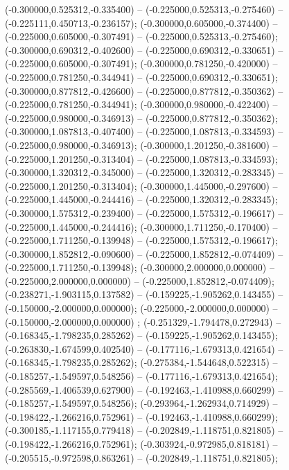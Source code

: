  (-0.300000,0.525312,-0.335400) -- (-0.225000,0.525313,-0.275460) -- (-0.225111,0.450713,-0.236157);
 (-0.300000,0.605000,-0.374400) -- (-0.225000,0.605000,-0.307491) -- (-0.225000,0.525313,-0.275460);
 (-0.300000,0.690312,-0.402600) -- (-0.225000,0.690312,-0.330651) -- (-0.225000,0.605000,-0.307491);
 (-0.300000,0.781250,-0.420000) -- (-0.225000,0.781250,-0.344941) -- (-0.225000,0.690312,-0.330651);
 (-0.300000,0.877812,-0.426600) -- (-0.225000,0.877812,-0.350362) -- (-0.225000,0.781250,-0.344941);
 (-0.300000,0.980000,-0.422400) -- (-0.225000,0.980000,-0.346913) -- (-0.225000,0.877812,-0.350362);
 (-0.300000,1.087813,-0.407400) -- (-0.225000,1.087813,-0.334593) -- (-0.225000,0.980000,-0.346913);
 (-0.300000,1.201250,-0.381600) -- (-0.225000,1.201250,-0.313404) -- (-0.225000,1.087813,-0.334593);
 (-0.300000,1.320312,-0.345000) -- (-0.225000,1.320312,-0.283345) -- (-0.225000,1.201250,-0.313404);
 (-0.300000,1.445000,-0.297600) -- (-0.225000,1.445000,-0.244416) -- (-0.225000,1.320312,-0.283345);
 (-0.300000,1.575312,-0.239400) -- (-0.225000,1.575312,-0.196617) -- (-0.225000,1.445000,-0.244416);
 (-0.300000,1.711250,-0.170400) -- (-0.225000,1.711250,-0.139948) -- (-0.225000,1.575312,-0.196617);
 (-0.300000,1.852812,-0.090600) -- (-0.225000,1.852812,-0.074409) -- (-0.225000,1.711250,-0.139948);
 (-0.300000,2.000000,0.000000) -- (-0.225000,2.000000,0.000000) -- (-0.225000,1.852812,-0.074409);
 (-0.238271,-1.903115,0.137582) -- (-0.159225,-1.905262,0.143455) -- (-0.150000,-2.000000,0.000000);
 (-0.225000,-2.000000,0.000000) -- (-0.150000,-2.000000,0.000000) ;
 (-0.251329,-1.794478,0.272943) -- (-0.168345,-1.798235,0.285262) -- (-0.159225,-1.905262,0.143455);
 (-0.263830,-1.674599,0.402540) -- (-0.177116,-1.679313,0.421654) -- (-0.168345,-1.798235,0.285262);
 (-0.275384,-1.544648,0.522315) -- (-0.185257,-1.549597,0.548256) -- (-0.177116,-1.679313,0.421654);
 (-0.285569,-1.406539,0.627900) -- (-0.192463,-1.410988,0.660299) -- (-0.185257,-1.549597,0.548256);
 (-0.293964,-1.262934,0.714929) -- (-0.198422,-1.266216,0.752961) -- (-0.192463,-1.410988,0.660299);
 (-0.300185,-1.117155,0.779418) -- (-0.202849,-1.118751,0.821805) -- (-0.198422,-1.266216,0.752961);
 (-0.303924,-0.972985,0.818181) -- (-0.205515,-0.972598,0.863261) -- (-0.202849,-1.118751,0.821805);
